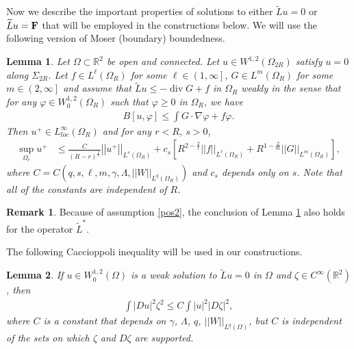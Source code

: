 \documentclass[12pt,reqno]{amsart}
\theoremstyle{plain}
\newtheorem{lem}{Lemma}
\theoremstyle{definition}
\newtheorem*{rem}{Remark}
\DeclareMathOperator{\di}{div}
\newcommand{\vp}{\varphi}
\newcommand{\ga}{\gamma}
\newcommand{\La}{\Lambda}
\newcommand{\Om}{\Omega}
\newcommand{\Si}{\Sigma}
\newcommand{\iny}{\infty}
\newcommand{\su}{\subset}
\newcommand{\gr}{\nabla}
\newcommand{\norm}[1]{\left\vert \left\vert #1\right\vert\right\vert}
\newcommand{\abs}[1]{\left\vert#1\right\vert}
\newcommand{\brac}[1]{\left[#1\right]}
\newcommand{\pr}[1]{\left( #1 \right) }
\newcommand{\pb}[1]{\left( #1 \right] }
\newcommand{\R}{\ensuremath{\mathbb{R}}}
\begin{document}
\begin{appendix}
Now we describe the important properties of solutions to either $\widetilde{L} u = 0$ or $\widetilde{L}u = \bf F$ that will be employed in the constructions below. We will use the following version of Moser (boundary) boundedness.

\begin{lem}{\rm\cite[Lemma~5.1]{DHM16}}
\label{l5.1}
Let $\Om \su \R^2$ be open and connected.
Let $u \in W^{1,2}\pr{\Om_{2R}}$ satisfy $u = 0$ along $\Si_{2R}$.
Let $f \in L^{\ell}\pr{\Om_{R}}$ for some $\ell \in \pb{ 1, \iny}$, $G \in L^{m}\pr{\Om_{R}}$ for some $m \in \pb{ 2, \iny}$ and assume that $\widetilde{L} u \le - \di G + f$ in $\Om_{R}$ weakly in the sense that for any $\vp \in W^{1,2}_{0}\pr{\Om_{R}}$ such that $\vp \ge 0$ in $\Om_{R}$, we have 
\begin{align*}
{B}\brac{u, \vp} \le \int G \cdot \gr \vp + f \vp .
\end{align*}
Then $u^+ \in L_{loc}^\iny\pr{\Om_R}$ and for any $r < R$, $s > 0$,
\begin{align}
\sup_{\Om_{r}} u^+ 
&\le \frac{C}{\pr{R- r}^{\frac 2 {s}}} \norm{u^+}_{L^{s}\pr{\Om_R}} 
+ c_{s} \brac{R^{2 - \frac 2 {\ell}}\norm{f}_{L^{\ell}\pr{\Om_R}} + R^{1 - \frac 2 {m}}\norm{G}_{L^{m}\pr{\Om_R}}},
\label{eqB.9}
\end{align}
where $C = C\pr{q, s, \ell, m, \ga,  \La, \norm{W}_{L^{q}\pr{\Om_R}}}$ and $c_{s}$ depends only on $s$.
Note that all of the constants are independent of $R$.
\end{lem}

\begin{rem}
Because of assumption \eqref{pos2}, the conclusion of Lemma \ref{l5.1} also holds for the operator $\widetilde{L}^*$.
\end{rem}

The following Caccioppoli inequality will be used in our constructions.

\begin{lem}{\rm\cite[Lemma~4.1]{DHM16}}
If $u \in W_0^{1,2}\pr{\Om}$ is a weak solution to $\widetilde{L} u = 0$ in $\Omega$ and $\zeta\in C^\infty(\R^2)$, then
\begin{align}
\int \abs{D u}^2 \zeta^2 \le C \int \abs{u}^2 \abs{D \zeta}^2,
\label{eqB.10}
\end{align}
where $C$ is a constant that depends on $\ga$, $\La$, $q$, $\norm{W}_{L^{q}\pr{\Om}}$, but $C$ is independent of the sets on which $\zeta$ and $D\zeta$ are supported. 
\label{Cacc}
\end{lem}


\end{appendix}
\end{document}
